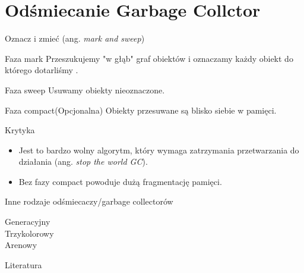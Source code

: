\documentclass{beamer}
\begin{document}
\section{Odśmiecanie  Garbage Collctor}

\begin{frame}{Oznacz i zmieć (ang. \textit{mark and sweep})}
    \begin{block}{Faza mark}
        Przeszukujemy "w głąb" graf obiektów i oznaczamy każdy obiekt do którego dotarliśmy \cite{mark-and-sweep}. 
    \end{block}
    \begin{block}{Faza sweep}
        Usuwamy obiekty nieoznaczone.
    \end{block}
        \begin{block}{Faza compact(Opcjonalna)}
        Obiekty przesuwane są blisko siebie w pamięci.
    \end{block}

    \begin{block}{Krytyka}
    \begin{itemize}
        \item Jest to bardzo wolny algorytm, który wymaga zatrzymania przetwarzania do działania (ang. \textit{stop the world GC}).
        \item  Bez fazy compact powoduje dużą fragmentację pamięci. 
    \end{itemize}
    \end{block}
\end{frame}

\begin{frame}{Inne rodzaje odśmiecaczy/garbage collectorów}
\begin{block}{}
Generacyjny \\
Trzykolorowy  \\
Arenowy
\end{block}


\end{frame}

\begin{frame}[allowframebreaks]{Literatura}

 
\end{frame}
\end{document}
